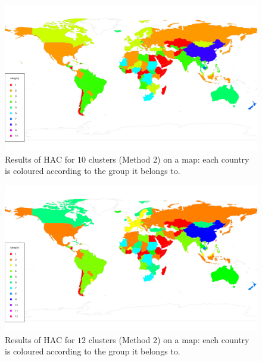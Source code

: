 \documentclass[a4paper,12pt]{article}
\numberwithin{equation}{section}
\begin{document}
\begin{figure}[t!]
\begin{minipage}[t]{0.98\textwidth}
\includegraphics[width=\textwidth]{plots/choropleth_alt_10}
\caption{Results of HAC for $10$ clusters (Method 2) on a map: each country is coloured according to the group it belongs to.}
\end{minipage}
\end{figure}

\begin{figure}[t!]
\begin{minipage}[t]{0.98\textwidth}
\includegraphics[width=\textwidth]{plots/choropleth_alt_12}
\caption{Results of HAC for $12$ clusters (Method 2) on a map: each country is coloured according to the group it belongs to.}
\end{minipage}
\end{figure}
\end{document}
